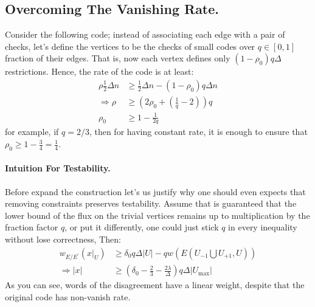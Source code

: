 \subsection { Overcoming The Vanishing Rate. } 
Consider the following code; instead of associating each edge with a pair of checks, let's define the vertices to be the checks of small codes over $q \in [0,1]$ fraction of their edges. That is, now each vertex defines only $\left( 1 - \rho_{0} \right)q\Delta$ restrictions. Hence, the rate of the code is at least:
\begin{equation*}
  \begin{split}
    \rho\frac{1}{2}\Delta n & \ge \frac{1}{2}\Delta n - \left(1 - \rho_{0} \right)q\Delta n \\
    \Rightarrow \rho & \ge \left(  2\rho_{0} + \left( \frac{1}{q}  - 2  \right)  \right)q \\ 
    \rho_{0} & \ge  1 - \frac{1}{2q} 
  \end{split}
\end{equation*} for example, if $q = 2/3$, then for having constant rate, it is enough to ensure that $ \rho_{0} \ge 1 - \frac{3}{4} = \frac{1}{4}$.

\paragraph{Intuition For Testability.}
Before expand the construction let's us justify why one should even expects that removing constraints preserves testability. Assume that is guaranteed that the lower bound of the flux on the trivial vertices remains up to multiplication by the fraction factor $q$, or put it differently, one could just stick $q$ in every inequality without lose correctness, Then: 
\begin{equation*}
  \begin{split}
    w_{E/E^{\prime}}\left( x|_{U} \right) & \ge  \delta_{0}q\Delta|U| -qw\left( E(U_{-1} \bigcup U_{+1} ,U)  \right) \\ 
    \Rightarrow |x| & \ge \left(  \delta_{0} - \frac{2}{3} - \frac{2\lambda}{\Delta} \right) q \Delta|U_{\max}|
  \end{split}
\end{equation*}
As you can see, \ireducable words of the disagreement have a linear weight, despite that the original code has non-vanish rate. 

